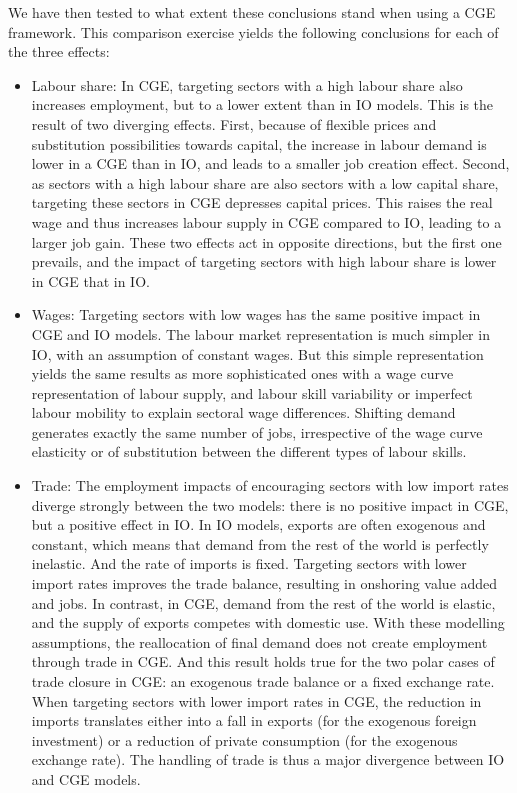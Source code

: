 We have then tested to what extent these conclusions stand when using a CGE framework. 
This comparison exercise yields the following conclusions for each of the three effects:
\begin{itemize}
	\item Labour share: In CGE, targeting sectors with a high labour share also increases employment, but to a lower extent than in IO models. This is the result of two diverging effects. First, because of flexible prices and substitution possibilities towards capital, the increase in labour demand is lower in a CGE than in IO, and leads to a smaller job creation effect. Second, as sectors with a high labour share are also sectors with a low capital share, targeting these sectors in CGE depresses capital prices. This raises the real wage and thus increases labour supply in CGE compared to IO, leading to a larger job gain. These two effects act in opposite directions, but the first one prevails, and the impact of targeting sectors with high labour share is lower in CGE that in IO.
	
	\item Wages: Targeting sectors with low wages has the same positive impact in CGE and IO models. The labour market representation is much simpler in IO, with an assumption of constant wages. But this simple representation yields the same results as more sophisticated ones with a wage curve representation of labour supply, and labour skill variability or imperfect labour mobility to explain sectoral wage differences. Shifting demand generates exactly the same number of jobs, irrespective of the wage curve elasticity or of substitution between the different types of labour skills.
	
	\item Trade: The employment impacts of encouraging sectors with low import rates diverge strongly between the two models: there is no positive impact in CGE, but a positive effect in IO. 
	In IO models, exports are often exogenous and constant, which means that demand from the rest of the world is perfectly inelastic. And the rate of imports is fixed. Targeting sectors with lower import rates improves the trade balance, resulting in onshoring value added and jobs. 
	In contrast, in CGE, demand from the rest of the world is elastic, and the supply of exports competes with domestic use. With these modelling assumptions, the reallocation of final demand does not create employment through trade in CGE. And this result holds true for the two polar cases of trade closure in CGE: an exogenous trade balance or a fixed exchange rate. When targeting sectors with lower import rates in CGE, the reduction in imports translates either into a fall in exports (for the exogenous foreign investment) or a reduction of private consumption (for the exogenous exchange rate).
	The handling of trade is thus a major divergence between IO and CGE models.
\end{itemize}

